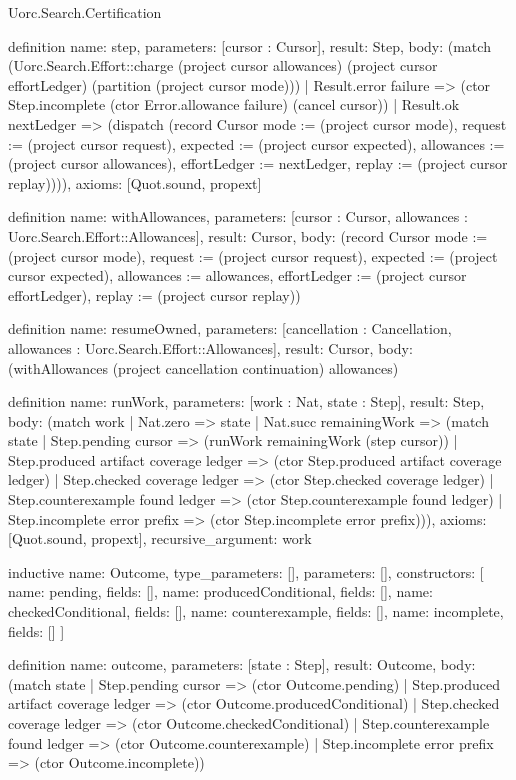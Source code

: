 \begin{lexlean}{Uorc.Search.Certification}
\begin{semanticmodule}
definition{
  name: step,
  parameters: [cursor : Cursor],
  result: Step,
  body: (match (Uorc.Search.Effort::charge (project cursor allowances) (project cursor effortLedger) (partition (project cursor mode)))
    | Result.error failure => (ctor Step.incomplete (ctor Error.allowance failure) (cancel cursor))
    | Result.ok nextLedger => (dispatch (record Cursor {mode := (project cursor mode), request := (project cursor request), expected := (project cursor expected), allowances := (project cursor allowances), effortLedger := nextLedger, replay := (project cursor replay)}))),
  axioms: [Quot.sound, propext]
}

definition{
  name: withAllowances,
  parameters: [cursor : Cursor, allowances : Uorc.Search.Effort::Allowances],
  result: Cursor,
  body: (record Cursor {mode := (project cursor mode), request := (project cursor request), expected := (project cursor expected), allowances := allowances, effortLedger := (project cursor effortLedger), replay := (project cursor replay)})
}

definition{
  name: resumeOwned,
  parameters: [cancellation : Cancellation, allowances : Uorc.Search.Effort::Allowances],
  result: Cursor,
  body: (withAllowances (project cancellation continuation) allowances)
}

definition{
  name: runWork,
  parameters: [work : Nat, state : Step],
  result: Step,
  body: (match work
    | Nat.zero => state
    | Nat.succ remainingWork => (match state
      | Step.pending cursor => (runWork remainingWork (step cursor))
      | Step.produced artifact coverage ledger => (ctor Step.produced artifact coverage ledger)
      | Step.checked coverage ledger => (ctor Step.checked coverage ledger)
      | Step.counterexample found ledger => (ctor Step.counterexample found ledger)
      | Step.incomplete error prefix => (ctor Step.incomplete error prefix))),
  axioms: [Quot.sound, propext],
  recursive_argument: work
}

inductive{
  name: Outcome,
  type_parameters: [],
  parameters: [],
  constructors: [
    {name: pending, fields: []},
    {name: producedConditional, fields: []},
    {name: checkedConditional, fields: []},
    {name: counterexample, fields: []},
    {name: incomplete, fields: []}
  ]
}

definition{
  name: outcome,
  parameters: [state : Step],
  result: Outcome,
  body: (match state
    | Step.pending cursor => (ctor Outcome.pending)
    | Step.produced artifact coverage ledger => (ctor Outcome.producedConditional)
    | Step.checked coverage ledger => (ctor Outcome.checkedConditional)
    | Step.counterexample found ledger => (ctor Outcome.counterexample)
    | Step.incomplete error prefix => (ctor Outcome.incomplete))
}


\end{semanticmodule}
\end{lexlean}
